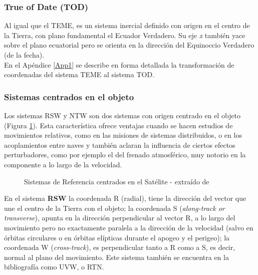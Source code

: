 {\subsubsection*{True of Date (TOD)}}
 Al igual que el TEME, es un sistema inercial definido con origen en el centro de la Tierra, con plano fundamental el Ecuador Verdadero. Su eje {\it{x}} tambi\'en yace sobre el plano ecuatorial pero se orienta en la direcci\'on del Equinoccio Verdadero (de la fecha).\\
 En el Ap\'endice \ref{App1} se describe en forma detallada la transformaci\'on de coordenadas del sistema TEME al sistema TOD.
 
\subsubsection*{Sistemas centrados en el objeto}
Los sistemas \ac{RSW} y \ac{NTW} son dos sistemas con origen centrado en el objeto (Figura \ref{fig:sistref}). Esta caracter\'istica ofrece ventajas cuando se hacen estudios de movimientos relativos, como en las misiones de sistemas distribuidos, o en los acoplamientos entre naves y tambi\'en aclaran la influencia de ciertos efectos perturbadores, como por ejemplo el del frenado atmosf\'erico, muy notorio en la componente a lo largo de la velocidad.\\

\begin{figure}[!h]
\centering
{}
\caption[Sistemas de Referencia centrados en el Sat\'elite]{Sistemas de Referencia centrados en el Sat\'elite - extra\'ido de \cite{leichen}}
\label{fig:sistref}
\end{figure}


En el sistema {\bf{RSW}} la coordenada R (radial), tiene la direcci\'on del vector que une el centro de la Tierra con el objeto; la coordenada S ({\it{along-track or transverse}}), apunta en la direcci\'on perpendicular al vector R, a lo largo del movimiento pero no exactamente paralela a la direcci\'on de la velocidad (salvo en \'orbitas circulares o en \'orbitas el\'ipticas durante el apogeo y el perigeo); la coordenada W ({\it{cross-track}}), es perpendicular tanto a R como a S, es decir, normal al plano del movimiento. Este sistema tambi\'en se encuentra en la bibliograf\'ia como UVW, o \ac{RTN}.\\

